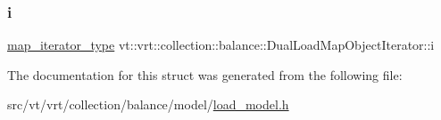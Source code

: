 \mbox{\label{structvt_1_1vrt_1_1collection_1_1balance_1_1_dual_load_map_object_iterator_a0edbc786a1f046560ba137163ed1187b}} 
\subsubsection{\texorpdfstring{i}{i}}
{\footnotesize\ttfamily \hyperlink{structvt_1_1vrt_1_1collection_1_1balance_1_1_dual_load_map_object_iterator_a86bac54b4dc71af6b0a7cf5aa7ced433}{map\+\_\+iterator\+\_\+type} vt\+::vrt\+::collection\+::balance\+::\+Dual\+Load\+Map\+Object\+Iterator\+::i}



The documentation for this struct was generated from the following file\+:\begin{DoxyCompactItemize}
\item 
src/vt/vrt/collection/balance/model/\hyperlink{load__model_8h}{load\+\_\+model.\+h}\end{DoxyCompactItemize}

